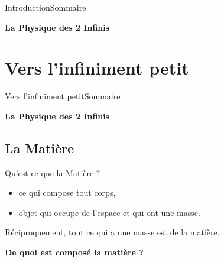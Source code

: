 \documentclass[handout,8pt]{beamer} %
\begin{document}
\begin{frame}{Introduction}{Sommaire}
	\begin{center}
		\begin{Large}
			\textbf{La Physique des 2 Infinis}
		\end{Large}
	\end{center}

	\tableofcontents[hideallsubsections] %
\end{frame}


\section{Vers l’infiniment petit}
\begin{frame}{Vers l’infiniment petit}{Sommaire}
	\begin{center}
		\begin{Large}
			\textbf{La Physique des 2 Infinis}
		\end{Large}
	\end{center}
\end{frame}

\subsection{La Matière}
\begin{frame}{Qu'est-ce que la Matière ?}

\begin{definition}
	\begin{itemize}
		\item ce qui compose tout corps,
		\item objet qui occupe de l'espace et qui ont une masse. 
	\end{itemize}
	Réciproquement, tout ce qui a une masse est de la matière.
\end{definition}
	
	\pause
	\begin{center}
		\textbf{De quoi est composé la matière ?}
	\end{center}
\end{frame}
\end{document}
